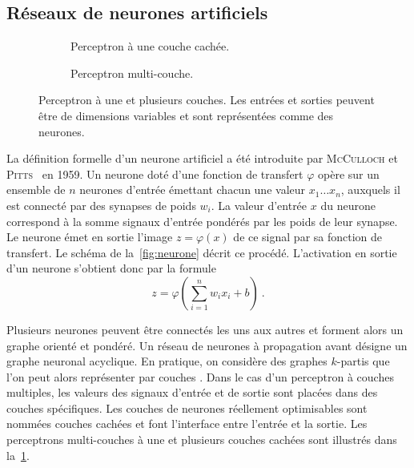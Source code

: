 \subsection{Réseaux de neurones artificiels}

\begin{figure}[t]
  \begin{subfigure}[b]{0.5\textwidth}
    \resizebox{\textwidth}{!}{
    
    }
  \caption{Perceptron à une couche cachée.}
  \end{subfigure}%
  \begin{subfigure}[b]{0.5\textwidth}
    \resizebox{\textwidth}{!}{
    
    }
  \caption{Perceptron multi-couche.}
  \end{subfigure}
  \caption{Perceptron à une et plusieurs couches. Les entrées et sorties peuvent être de dimensions variables et sont représentées comme des neurones.}
  \label{fig:perceptron}
\end{figure}

La définition formelle d'un neurone artificiel a été introduite par \textsc{McCulloch} et \textsc{Pitts}~\cite{lettvin_what_1959} en 1959. Un neurone doté d'une fonction de transfert $\varphi$ opère sur un ensemble de $n$ neurones d'entrée émettant chacun une valeur $x_1\dots{}x_n$, auxquels il est connecté par des synapses de poids $w_i$. La valeur d'entrée $x$ du neurone correspond à la somme signaux d'entrée pondérés par les poids de leur synapse. Le neurone émet en sortie l'image $z = \varphi(x)$ de ce signal par sa fonction de transfert. Le schéma de la~\cref{fig:neurone} décrit ce procédé. L'activation en sortie d'un neurone s'obtient donc par la formule
\begin{equation}
z = \varphi\left(\sum_{i=1}^n w_i x_i + b\right)~.
\end{equation}

Plusieurs neurones peuvent être connectés les uns aux autres et forment alors un graphe orienté et pondéré. Un réseau de neurones à propagation avant désigne un graphe neuronal acyclique. En pratique, on considère des graphes $k$-partis que l'on peut alors représenter par \og couches \fg. Dans le cas d'un perceptron à couches multiples, les valeurs des signaux d'entrée et de sortie sont placées dans des couches spécifiques. Les couches de neurones réellement optimisables sont nommées \og couches cachées \fg{} et font l'interface entre l'entrée et la sortie. Les perceptrons multi-couches à une et plusieurs couches cachées sont illustrés dans la~\cref{fig:perceptron}.

